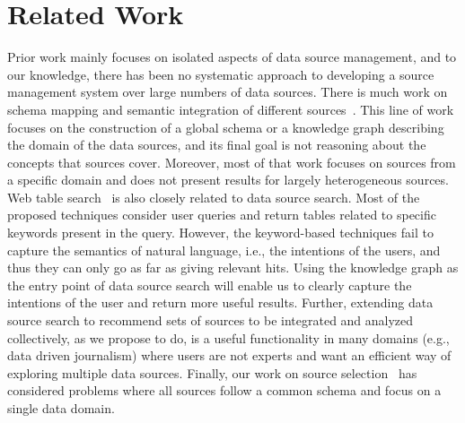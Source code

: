 \documentclass{sig-alternate}
\begin{document}
\section{Related Work}
\label{sec:related}
Prior work mainly focuses on isolated aspects of data source management, and to our knowledge, there has been no systematic approach to developing a source management system over large numbers of data sources. There is much work on schema mapping and semantic integration of different
sources~\cite{cafarella:2009,venetis:11, oktie:13}. This line of work focuses on the construction of a global schema or a knowledge graph describing the domain of the data sources, and its final goal is not reasoning about the concepts that sources cover. Moreover, most of that work focuses on sources from a specific domain and does not present results for largely heterogeneous sources. Web table search~\cite{cafarella:2009,limaye:2010, dassarma:2012,yakout:2012, fan:2014} is also closely related to data source search. Most of the proposed techniques consider user queries and return tables related to specific keywords present in the query. However, the keyword-based techniques fail to capture the semantics of natural language, i.e., the intentions of the users, and thus they can only go as far as giving relevant hits. Using the knowledge graph as the entry point of data source search will enable us to clearly capture the intentions of the user and return more useful results. Further, extending data source search to recommend sets of sources to be integrated and analyzed collectively, as we propose to do, is a useful functionality in many domains (e.g., data driven journalism) where users are not experts and want an efficient way of exploring multiple data sources.  Finally, our work on source selection~\cite{dong:vldb13, rekatsinas:2014} has considered problems where all sources follow a common schema and focus on a single data domain.
\end{document}
